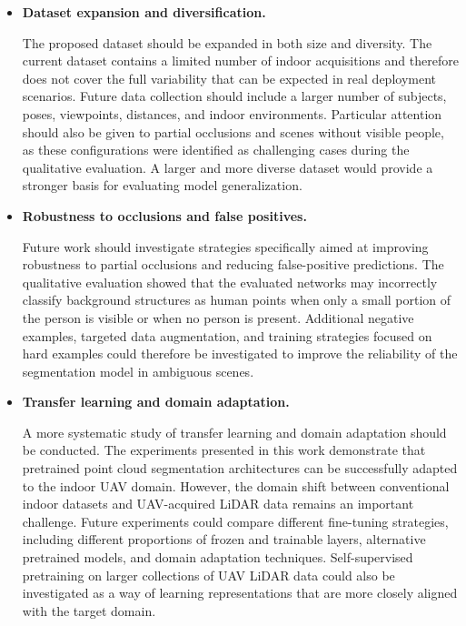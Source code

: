 \begin{itemize}


\item \textbf{Dataset expansion and diversification.}

The proposed dataset should be expanded in both size and diversity. The current dataset contains a limited number of indoor acquisitions and therefore does not cover the full variability that can be expected in real deployment scenarios. Future data collection should include a larger number of subjects, poses, viewpoints, distances, and indoor environments. Particular attention should also be given to partial occlusions and scenes without visible people, as these configurations were identified as challenging cases during the qualitative evaluation. A larger and more diverse dataset would provide a stronger basis for evaluating model generalization.

\item \textbf{Robustness to occlusions and false positives.}

Future work should investigate strategies specifically aimed at improving robustness to partial occlusions and reducing false-positive predictions. The qualitative evaluation showed that the evaluated networks may incorrectly classify background structures as human points when only a small portion of the person is visible or when no person is present. Additional negative examples, targeted data augmentation, and training strategies focused on hard examples could therefore be investigated to improve the reliability of the segmentation model in ambiguous scenes.

\item \textbf{Transfer learning and domain adaptation.}

A more systematic study of transfer learning and domain adaptation should be conducted. The experiments presented in this work demonstrate that pretrained point cloud segmentation architectures can be successfully adapted to the indoor UAV domain. However, the domain shift between conventional indoor datasets and UAV-acquired LiDAR data remains an important challenge. Future experiments could compare different fine-tuning strategies, including different proportions of frozen and trainable layers, alternative pretrained models, and domain adaptation techniques. Self-supervised pretraining on larger collections of UAV LiDAR data could also be investigated as a way of learning representations that are more closely aligned with the target domain.


\end{itemize}

